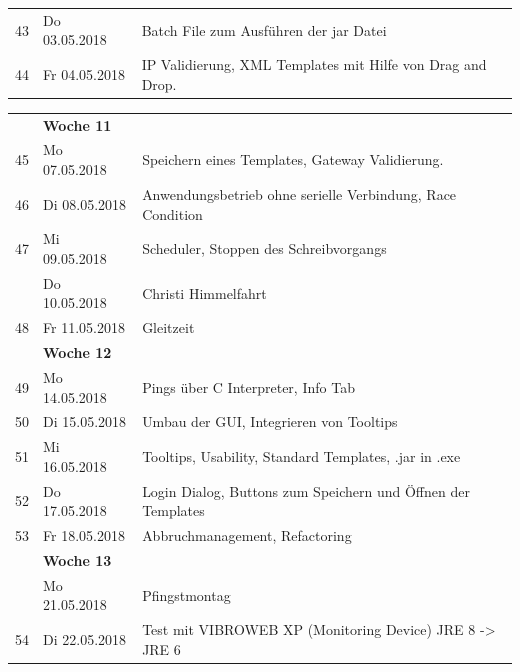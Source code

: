\documentclass{article}
\begin{document}
{\begin{tabular}{l|p{2.5cm}|p{15cm}}
		43 & Do 03.05.2018 & 
		 Batch File zum Ausführen der jar Datei\\

		44 & Fr 04.05.2018 & 
		IP Validierung, XML Templates mit Hilfe von Drag and Drop.\\

		
	\end{tabular}
	\begin{tabular}{l|p{2.5cm}|p{15cm}}
		

		& \textbf{Woche 11}&\\

		
		
		45 & Mo 07.05.2018	  & 
		Speichern eines Templates, Gateway Validierung.\\

		46& Di 08.05.2018	  & 
		Anwendungsbetrieb ohne serielle Verbindung, Race Condition\\

		47 & Mi 09.05.2018		 & 
		Scheduler, Stoppen des Schreibvorgangs\\

		& Do 10.05.2018  & 
		Christi Himmelfahrt\\

		48 & Fr 11.05.2018 & 
		Gleitzeit\\


		& \textbf{Woche 12}&\\

		
		
		49 & Mo 14.05.2018	  & 
		Pings über C Interpreter, Info Tab\\

		50 & Di 15.05.2018	  & 
		Umbau der GUI, Integrieren von Tooltips\\

		51 & Mi 16.05.2018		 & 
		Tooltips, Usability, Standard Templates, .jar in .exe \\

		52 & Do 17.05.2018  & 
		Login Dialog, Buttons zum Speichern und Öffnen der Templates\\

		53 & Fr 18.05.2018 & 
		Abbruchmanagement, Refactoring\\


		& \textbf{Woche 13}&\\

		
		& Mo 21.05.2018	  & 
		Pfingstmontag\\

		54 & Di 22.05.2018	  & 
		Test mit VIBROWEB XP (Monitoring Device) JRE 8 -> JRE 6\\


\end{tabular}}
\end{document}
